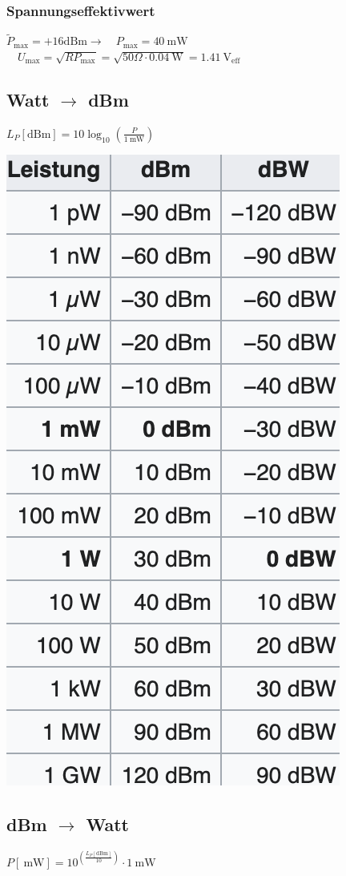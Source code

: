 \subsubsection{Spannungseffektivwert}
$\widetilde{P}_{\max }=+16 \mathrm{dBm} \rightarrow \quad P_{\max }=40 \mathrm{~mW} $\\
$\quad U_{\max }=\sqrt{R P_{\max }}=\sqrt{50 \Omega \cdot 0.04 \mathrm{~W}}=1.41 \mathrm{~V}_{\mathrm{eff}}$


\subsection{Watt $\rightarrow$ dBm}
$L_{P}[\mathrm{dBm}]=10 \log _{10}\left(\frac{P}{1 \mathrm{~mW}}\right)$
\vspace{-8pt}
\begin{center}
    \includegraphics[scale=.3]{graphic/signalparameter/dbm-tabelle.png}
\end{center}
\vspace{-8pt}


\subsection{dBm $\rightarrow$ Watt}
$P[\mathrm{~mW}]=10^{\left(\frac{L_{P}[\mathrm{dBm}]}{10}\right)} \cdot 1 \mathrm{~mW}$
